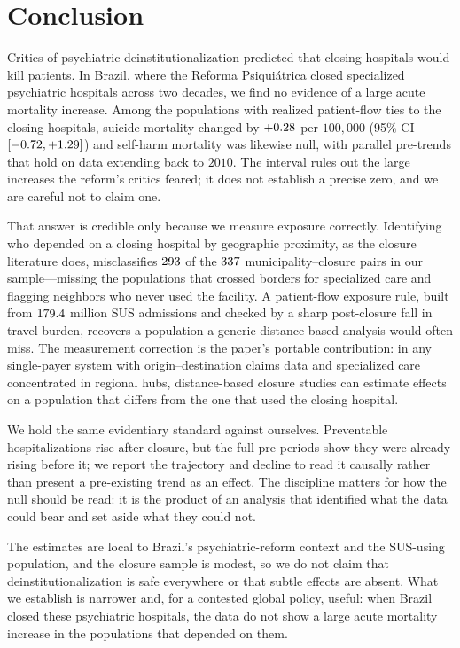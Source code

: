 \section{Conclusion}
\label{sec:conclusion}

Critics of psychiatric deinstitutionalization predicted that closing
hospitals would kill patients. In Brazil, where the Reforma Psiquiátrica
closed specialized psychiatric hospitals across two decades, we find no
evidence of a large acute mortality increase. Among the populations with
realized patient-flow ties to the closing hospitals, suicide mortality changed by $+0.28$ per
$100{,}000$ (95\% CI $[-0.72, +1.29]$) and self-harm mortality was
likewise null, with parallel pre-trends that hold on data extending back
to $2010$. The interval rules out the large increases the reform's
critics feared; it does not establish a precise zero, and we are careful
not to claim one.

That answer is credible only because we measure exposure correctly.
Identifying who depended on a closing hospital by geographic proximity,
as the closure literature does, misclassifies $293$ of the $337$
municipality--closure pairs in our sample---missing the populations that
crossed borders for specialized care and flagging neighbors who never
used the facility. A patient-flow exposure rule, built from $179.4$
million SUS admissions and checked by a sharp post-closure fall in
travel burden, recovers a population a generic distance-based analysis
would often miss. The measurement correction is the paper's portable
contribution: in any single-payer system with origin--destination claims
data and specialized care concentrated in regional hubs, distance-based
closure studies can estimate effects on a population that differs from
the one that used the closing hospital.

We hold the same evidentiary standard against ourselves. Preventable
hospitalizations rise after closure, but the full pre-periods show they
were already rising before it; we report the trajectory and decline to
read it causally rather than present a pre-existing trend as an effect.
The discipline matters for how the null should be read: it is the
product of an analysis that identified what the data could bear and set
aside what they could not.

The estimates are local to Brazil's psychiatric-reform context and the
SUS-using population, and the closure sample is modest, so we do not
claim that deinstitutionalization is safe everywhere or that subtle effects
are absent. What we establish is narrower and, for a contested
global policy, useful: when Brazil closed these psychiatric hospitals,
the data do not show a large acute mortality increase in the populations
that depended on them.
